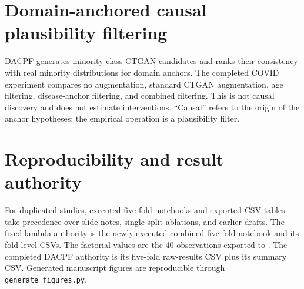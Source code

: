 \section{Domain-anchored causal plausibility filtering}

DACPF generates minority-class CTGAN candidates and ranks their consistency with real minority distributions for domain anchors. The completed COVID experiment compares no augmentation, standard CTGAN augmentation, age filtering, disease-anchor filtering, and combined filtering. This is not causal discovery and does not estimate interventions. ``Causal'' refers to the origin of the anchor hypotheses; the empirical operation is a plausibility filter.

\section{Reproducibility and result authority}

For duplicated studies, executed five-fold notebooks and exported CSV tables take precedence over slide notes, single-split ablations, and earlier drafts. The fixed-lambda authority is the newly executed combined five-fold notebook and its fold-level CSVs. The factorial values are the 40 observations exported to . The completed DACPF authority is its five-fold raw-results CSV plus its summary CSV. Generated manuscript figures are reproducible through \texttt{generate\_figures.py}.
